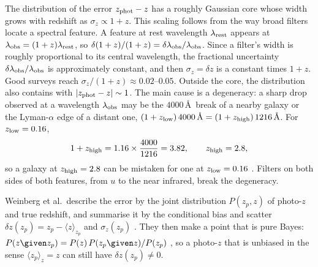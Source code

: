 The distribution of the error $z_{\rm phot}-z$ has a roughly Gaussian core whose width grows with redshift as $\sigma_z\propto1+z$. This scaling follows from the way broad filters locate a spectral feature. A feature at rest wavelength $\lambda_{\rm rest}$ appears at $\lambda_{\rm obs}=(1+z)\lambda_{\rm rest}$, so $\delta(1+z)/(1+z)=\delta\lambda_{\rm obs}/\lambda_{\rm obs}$. Since a filter's width is roughly proportional to its central wavelength, the fractional uncertainty $\delta\lambda_{\rm obs}/\lambda_{\rm obs}$ is approximately constant, and then $\sigma_z=\delta z$ is a constant times $1+z$. Good surveys reach $\sigma_z/(1+z)\approx0.02$--$0.05$. Outside the core, the distribution also contains  with $|z_{\rm phot}-z|\sim1$. The main cause is a degeneracy: a sharp drop observed at a wavelength $\lambda_{\rm obs}$ may be the $4000$\,\AA\ break of a nearby galaxy or the Lyman-$\alpha$ edge of a distant one, $(1+z_{\rm low})\,4000\,\text{\AA}=(1+z_{\rm high})\,1216\,\text{\AA}$. For $z_{\rm low}=0.16$,
\[
  1+z_{\rm high}=1.16\times\frac{4000}{1216}=3.82,\qquad z_{\rm high}=2.8 ,
\]
so a galaxy at $z_{\rm high}=2.8$ can be mistaken for one at $z_{\rm low}=0.16$ \cite[p.~96]{Weinberg2013}. Filters on both sides of both features, from $u$ to the near infrared, break the degeneracy.

Weinberg et al.\ describe the error by the joint distribution $P(z_p,z)$ of photo-$z$ and true redshift, and summarise it by the conditional bias and scatter $\delta z(z_p)=z_p-\langle z\rangle_{z_p}$ and $\sigma_z(z_p)$ \cite[p.~94, eq.~(100)]{Weinberg2013}. They then make a point that is pure Bayes: $P(z\given z_p)=P(z)\,P(z_p\given z)/P(z_p)$ \cite[eq.~(101)]{Weinberg2013}, so a photo-$z$ that is unbiased in the sense $\langle z_p\rangle_z=z$ can still have $\delta z(z_p)\ne0$.

